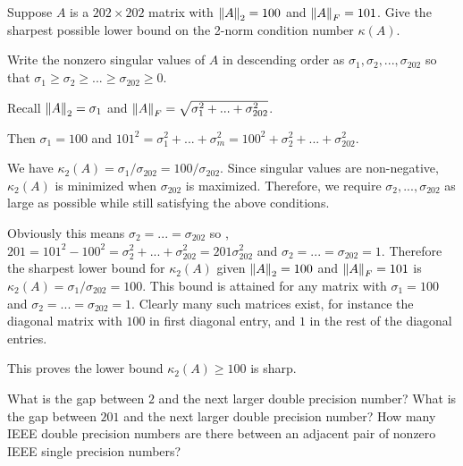 \documentclass[10pt]{article}
\begin{document}
\maketitle

\begin{problem}[Exercise 12.1]
Suppose \( A \) is a \( 202\times 202 \) matrix with \( \left\lVert A\right\rVert_2=100 \) and \( \left\lVert A\right\rVert_F=101 \). Give the sharpest possible lower bound on the 2-norm condition number \( \kappa(A) \).
\end{problem}

\begin{solution}[Solution]
Write the nonzero singular values of \( A \) in descending order as \( \sigma_1,\sigma_2, ..., \sigma_{202} \) so that \( \sigma_1\geq \sigma_2 \geq ...\geq \sigma_{202} \geq 0 \).

Recall \( \left\lVert A\right\rVert_2 = \sigma_1 \) and \( \left\lVert A\right\rVert_F = \sqrt{\sigma_1^2+...+\sigma_{202}^2} \).

Then \( \sigma_1 = 100 \) and \( 101^2 = \sigma_1^2 + ... + \sigma_m^2 = 100^2 + \sigma_2^2 + ... + \sigma_{202}^2 \).

We have \( \kappa_2(A) = \sigma_1/\sigma_{202} = 100/\sigma_{202} \). Since singular values are non-negative, \( \kappa_2(A) \) is minimized when \( \sigma_{202} \) is maximized. Therefore, we require \( \sigma_2, ..., \sigma_{202} \) as large as possible while still satisfying the above conditions. %

Obviously this means \( \sigma_2 = ... = \sigma_{202} \) so , \( 201 = 101^2-100^2 = \sigma_2^2+...+\sigma_{202}^2 = 201\sigma_{202}^2 \) and \( \sigma_{2} = ... = \sigma_{202} = 1 \). Therefore the sharpest lower bound for \( \kappa_2(A) \) given \( \left\lVert A\right\rVert_2=100 \) and \( \left\lVert A\right\rVert_F=101 \) is \( \kappa_2(A) = \sigma_1/\sigma_{202} = 100 \). This bound is attained for any matrix with \( \sigma_1=100 \) and \( \sigma_2=...=\sigma_{202}=1 \). Clearly many such matrices exist, for instance the diagonal matrix with \( 100 \) in first diagonal entry, and \( 1 \) in the rest of the diagonal entries. 

This proves the lower bound \( \kappa_2(A) \geq 100 \) is sharp.

\end{solution}

\begin{problem}[Exercise 2]
What is the gap between \( 2 \) and the next larger double precision number?  What is the gap between \( 201 \) and the next larger double precision number?  How many IEEE double precision numbers are there between an adjacent pair of nonzero IEEE single precision numbers?
\end{problem}
\end{document}
